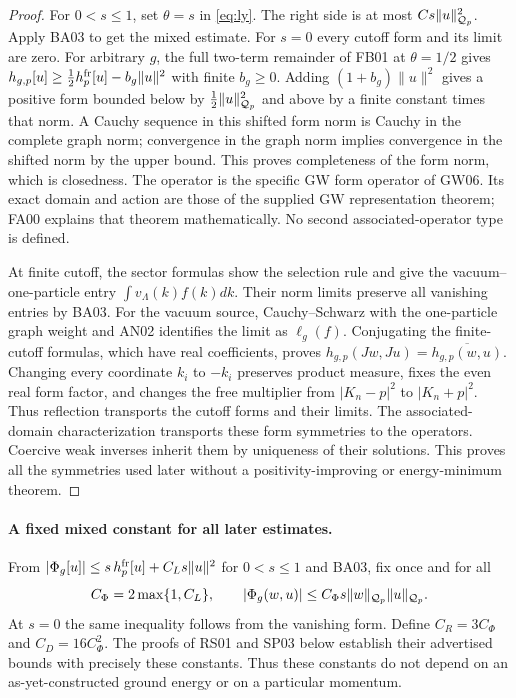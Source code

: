 \documentclass[11pt,a4paper]{article}
\theoremstyle{remark}\newtheorem{remark}[theorem]{Remark}
\begin{document}
\begin{proof}
For $0<s\leq1$, set $\theta=s$ in \eqref{eq:ly}. The right side is at most $C s\|u\|_{\mathcal Q_p}^2$. Apply BA03 to get the mixed estimate. For $s=0$ every cutoff form and its limit are zero. For arbitrary $g$, the full two-term remainder of FB01 at $\theta=1/2$ gives $h_{g,p}[u]\geq\tfrac12h_p^{\rm fr}[u]-b_g\|u\|^2$ with finite $b_g\geq0$. Adding $(1+b_g)\|u\|^2$ gives a positive form bounded below by $\tfrac12\|u\|_{\mathcal Q_p}^2$ and above by a finite constant times that norm. A Cauchy sequence in this shifted form norm is Cauchy in the complete graph norm; convergence in the graph norm implies convergence in the shifted norm by the upper bound. This proves completeness of the form norm, which is closedness. The operator is the specific GW form operator of GW06. Its exact domain and action are those of the supplied GW representation theorem; FA00 explains that theorem mathematically. No second associated-operator type is defined.

At finite cutoff, the sector formulas show the selection rule and give the vacuum--one-particle entry $\int v_\Lambda(k)f(k)dk$. Their norm limits preserve all vanishing entries by BA03. For the vacuum source, Cauchy--Schwarz with the one-particle graph weight and AN02 identifies the limit as $\ell_g(f)$. Conjugating the finite-cutoff formulas, which have real coefficients, proves $h_{g,p}(Jw,Ju)=\overline{h_{g,p}(w,u)}$. Changing every coordinate $k_i$ to $-k_i$ preserves product measure, fixes the even real form factor, and changes the free multiplier from $|K_n-p|^2$ to $|K_n+p|^2$. Thus reflection transports the cutoff forms and their limits. The associated-domain characterization transports these form symmetries to the operators. Coercive weak inverses inherit them by uniqueness of their solutions. This proves all the symmetries used later without a positivity-improving or energy-minimum theorem.
\end{proof}


\paragraph{A fixed mixed constant for all later estimates.}
From $|\Phi_g[u]|\leq s\,h_p^{\rm fr}[u]+C_Ls\|u\|^2$ for $0<s\leq1$ and BA03, fix once and for all
\[
 C_\Phi=2\max\{1,C_L\},\qquad
 |\Phi_g(w,u)|\leq C_\Phi s\|w\|_{\mathcal Q_p}\|u\|_{\mathcal Q_p}.
\]
At $s=0$ the same inequality follows from the vanishing form. Define $C_R=3C_\Phi$ and $C_D=16C_\Phi^2$. The proofs of RS01 and SP03 below establish their advertised bounds with precisely these constants. Thus these constants do not depend on an as-yet-constructed ground energy or on a particular momentum.
\end{document}
